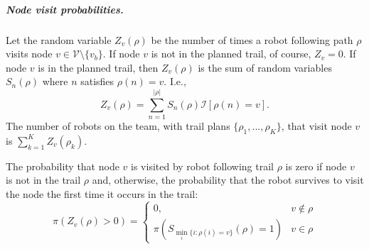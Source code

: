 \documentclass[11pt, oneside]{article}
\begin{document}
\subparagraph{Node visit probabilities.} 
Let the random variable $Z_v(\rho)$ be the number of times a robot following path $\rho$ visits node $v\in \mathcal{V} \setminus \{v_b\}$. 
If node $v$ is not in the planned trail, of course, $Z_v=0$. If node $v$ is in the planned trail, then $Z_v(\rho)$ is the sum of random variables $S_n(\rho)$ where $n$ satisfies $\rho(n)=v$. I.e.,
\begin{equation}
	Z_v(\rho) = \sum_{n=1}^{\lvert \rho \rvert} S_n(\rho) \mathcal{I}[\rho(n) = v].
\end{equation}
The number of robots on the team, with trail plans $\{\rho_1,...,\rho_K\}$, that visit node $v$ is $\sum_{k=1}^K Z_v(\rho_k)$.

The probability that node $v$ is visited by robot following trail $\rho$ is zero if node $v$ is not in the trail $\rho$ and, otherwise, the probability that the robot survives to visit the node the first time it occurs in the trail:
\begin{equation}
	\pi(Z_v(\rho) > 0)= 
	\begin{cases}
	 0, & v \notin \rho \\
	 \pi(S_{\min_{i} \{i : \rho(i) =v\} } (\rho) = 1) & v \in \rho
	\end{cases} \label{eq:node_visisted}
\end{equation}
\end{document}
